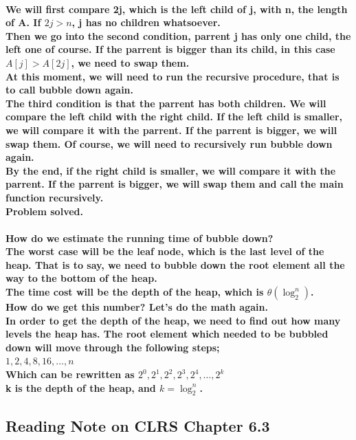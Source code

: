 \documentclass{article}
\begin{document}
\paragraph{We will first compare 2j, which is the left child of j, with n, the length of A.
If $2j > n $, j has no children whatsoever. \\
Then we go into the second condition, parrent j has only one child, the left one of course.
If the parrent is bigger than its child, in this case $A[j] > A[2j]$, we need to swap them.\\
At this moment, we will need to run the recursive procedure, that is to call bubble down again.\\
The third condition is that the parrent has both children. We will compare the left child with the right child. 
If the left child is smaller, we will compare it with the parrent. If the parrent is bigger, we will swap them. 
Of course, we will need to recursively run bubble down again.\\
By the end, if the right child is smaller, we will compare it with the parrent. 
If the parrent is bigger, we will swap them and call the main function recursively.\\
Problem solved.\\}

\paragraph{How do we estimate the running time of bubble down?\\
The worst case will be the leaf node, which is the last level of the heap. That is to say, we need to bubble down the root element all the way to the bottom of the heap.\\
The time cost will be the depth of the heap, which is $\theta(\log_2^n)$.\\
How do we get this number? Let's do the math again.\\
In order to get the depth of the heap, we need to find out how many levels the heap has.
The root element which needed to be bubbled down will move through the following steps;\\
$1,2,4,8,16, \ldots ,n$\\
Which can be rewritten as $2^0,2^1,2^2,2^3,2^4, \ldots ,2^k$\\
k is the depth of the heap, and $k = \log_2^n$.\\}

\subsection{Reading Note on CLRS Chapter 6.3}
\end{document}

